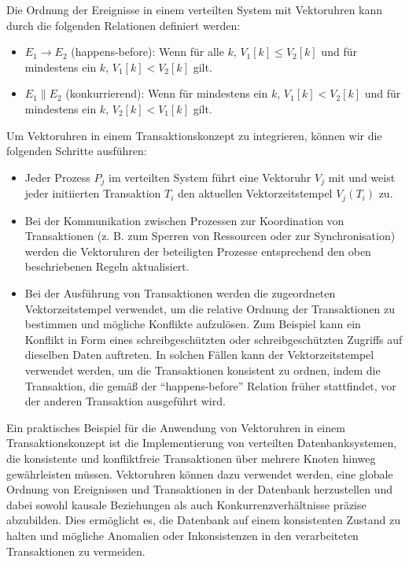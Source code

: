 Die Ordnung der Ereignisse in einem verteilten System mit Vektoruhren kann durch die folgenden Relationen definiert werden:
\begin{itemize}
\item $E_1 \to E_2$ (happens-before): Wenn für alle $k$, $V_1[k] \leq V_2[k]$ und für mindestens ein $k$, $V_1[k] < V_2[k]$ gilt.
\item $E_1 \parallel E_2$ (konkurrierend): Wenn für mindestens ein $k$, $V_1[k] < V_2[k]$ und für mindestens ein $k$, $V_2[k] < V_1[k]$ gilt.
\end{itemize}
Um Vektoruhren in einem Transaktionskonzept zu integrieren, können wir die folgenden Schritte ausführen:
\begin{itemize}
\item Jeder Prozess $P_j$ im verteilten System führt eine Vektoruhr $V_j$ mit und weist jeder initiierten Transaktion $T_i$ den aktuellen Vektorzeitstempel $V_j(T_i)$ zu.
\item Bei der Kommunikation zwischen Prozessen zur Koordination von Transaktionen (z. B. zum Sperren von Ressourcen oder zur Synchronisation) werden die Vektoruhren der beteiligten Prozesse entsprechend den oben beschriebenen Regeln aktualisiert.
\item Bei der Ausführung von Transaktionen werden die zugeordneten Vektorzeitstempel verwendet, um die relative Ordnung der Transaktionen zu bestimmen und mögliche Konflikte aufzulösen. Zum Beispiel kann ein Konflikt in Form eines schreibgeschützten oder schreibgeschützten Zugriffs auf dieselben Daten auftreten. In solchen Fällen kann der Vektorzeitstempel verwendet werden, um die Transaktionen konsistent zu ordnen, indem die Transaktion, die gemäß der \enquote{happens-before} Relation früher stattfindet, vor der anderen Transaktion ausgeführt wird.
\end{itemize}

Ein praktisches Beispiel für die Anwendung von Vektoruhren in einem Transaktionskonzept ist die Implementierung von verteilten Datenbanksystemen, die konsistente und konfliktfreie Transaktionen über mehrere Knoten hinweg gewährleisten müssen. Vektoruhren können dazu verwendet werden, eine globale Ordnung von Ereignissen und Transaktionen in der Datenbank herzustellen und dabei sowohl kausale Beziehungen als auch Konkurrenzverhältnisse präzise abzubilden. Dies ermöglicht es, die Datenbank auf einem konsistenten Zustand zu halten und mögliche Anomalien oder Inkonsistenzen in den verarbeiteten Transaktionen zu vermeiden.

